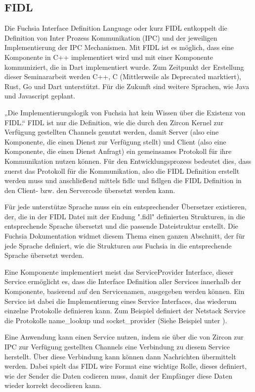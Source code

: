 \documentclass[a4paper]{scrartcl}
\begin{document}
\subsection{FIDL}
\label{sec:FIDL}
Die Fuchsia Interface Definition Language oder kurz FIDL entkoppelt die Definition von Inter Prozess Kommunikation (IPC) und der jeweiligen Implementierung der IPC Mechanismen. Mit FIDL ist es möglich, dass eine Komponente in C++ implementiert wird und mit einer Komponente kommuniziert, die in Dart implementiert wurde. Zum Zeitpunkt der Erstellung dieser Seminararbeit werden C++, C (Mittlerweile als Deprecated marktiert), Rust, Go und Dart unterstützt. Für die Zukunft sind weitere Sprachen, wie Java und Javascript geplant. \cite{Fuchsia.FIDLOverview}

„Die Implementierungslogik von Fuchsia hat kein Wissen über die Existenz von FIDL.“ \cite{Fuchsia.FIDLOverview} FIDL ist nur die Definition, wie die durch den Zircon Kernel zur Verfügung gestellten Channels genutzt werden, damit Server (also eine Komponente, die einen Dienst zur Verfügung stellt) und Client (also eine Komponente, die einen Dienst Anfragt) ein gemeinsames Protokoll für ihre Kommunikation nutzen können. Für den Entwicklungsprozess bedeutet dies, dass zuerst das Protokoll für die Kommunikation, also die FIDL Definition erstellt werden muss und anschließend mittels fidlc und fidlgen die FIDL Definition in den Client- bzw. den Servercode übersetzt werden kann.

Für jede unterstütze Sprache muss ein ein entsprechender Übersetzer existieren, der, die in der FIDL Datei mit der Endung ".fidl" definierten Strukturen, in die entsprechende Sprache übersetzt und die passende Dateistruktur erstellt. Die Fuchsia Dokumentation widmet diesem Thema einen ganzen Abschnitt, der für jede Sprache definiert, wie die Strukturen aus Fuchsia in die entsprechende Sprache übersetzt werden.\cite{Fuchsia.FIDLBindings.Overview}

Eine Komponente implementiert meist das ServiceProvider Interface, dieser Service ermöglicht es, dass die Interface Definition aller Services innerhalb der Komponente, basierend auf den Servicenamen, ausgegeben werden können. Ein Service ist dabei die Implementierung eines Service Interfaces, das wiederum einzelne Protokolle definieren kann. Zum Beispiel definiert der Netstack Service die Protokolle name\_lookup und socket\_provider (Siehe Beispiel unter \cite{Fuchsia.Components.Servies}).

Eine Anwendung kann einen Service nutzen, indem sie über die von Zircon zur IPC zur Verfügung gestellten Channels eine Verbindung zu diesem Service herstellt. Über diese Verbindung kann können dann Nachrichten übermittelt werden. Dabei spielt das FIDL wire Format eine wichtige Rolle, dieses definiert, wie der Sender die Daten codieren muss, damit der Empfänger diese Daten wieder korrekt decodieren kann.
\end{document}
